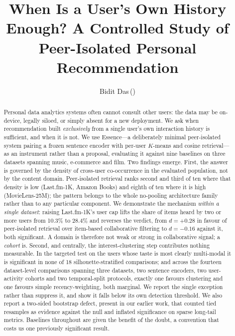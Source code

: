 \documentclass[runningheads,a4paper]{llncs}
\begin{document}
\title{When Is a User's Own History Enough? A Controlled Study of
Peer-Isolated Personal Recommendation}

\author{Bidit Das\,(\Letter)}

\maketitle

\begin{abstract}
Personal data analytics systems often cannot consult other users: the data may be
on-device, legally siloed, or simply absent for a new deployment. We ask when
recommendation built \emph{exclusively} from a single user's own interaction history is
sufficient, and when it is not. We use Essence---a deliberately minimal peer-isolated
system pairing a frozen sentence encoder with per-user $K$-means and cosine
retrieval---as an instrument rather than a proposal, evaluating it against nine baselines
on three datasets spanning music, e-commerce and film.
Two findings emerge. First, the answer is governed by the density of cross-user
co-occurrence in the evaluated population, not by the content domain. Peer-isolated
retrieval ranks second and third of ten where that density is low (Last.fm-1K, Amazon
Books) and eighth of ten where it is high (MovieLens-25M); the pattern belongs to the
whole no-pooling architecture family rather than to any particular component. We
demonstrate the mechanism \emph{within a single dataset}: raising Last.fm-1K's user cap
lifts the share of items heard by two or more users from 10.3\% to 28.4\% and reverses the
verdict, from $d = +0.28$ in favour of peer-isolated retrieval over item-based
collaborative filtering to $d = -0.16$ against it, both significant. A domain is therefore
not weak or strong in collaborative signal; a \emph{cohort} is. Second, and centrally, the interest-clustering step contributes nothing
measurable. In the targeted test on the users whose taste is most clearly multi-modal it is
significant in none of 18 silhouette-stratified comparisons; and across the fourteen
dataset-level comparisons spanning three datasets, two sentence encoders, two user-activity
cohorts and two temporal-split protocols, exactly one favours clustering and one favours
simple recency-weighting, both marginal.
We report the single exception rather than suppress it, and show it falls below its own
detection threshold. We also report a two-sided bootstrap defect, present in our earlier
work, that counted tied resamples as evidence against the null and inflated significance
on sparse long-tail metrics. Baselines throughout are given the benefit of the doubt, a
convention that costs us one previously significant result.
\end{abstract}
\end{document}
